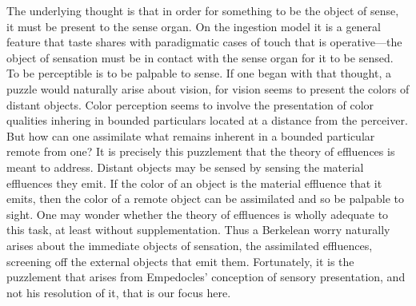 \documentclass[12pt]{article}
\begin{document}
The underlying thought is that in order for something to be the object of sense, it must be present to the sense organ. On the ingestion model it is a general feature that taste shares with paradigmatic cases of touch that is operative---the object of sensation must be in contact with the sense organ for it to be sensed. To be perceptible is to be palpable to sense. If one began with that thought, a puzzle would naturally arise about vision, for vision seems to present the colors of distant objects. Color perception seems to involve the presentation of color qualities inhering in bounded particulars located at a distance from the perceiver. But how can one assimilate what remains inherent in a bounded particular remote from one? It is precisely this puzzlement that the theory of effluences is meant to address. Distant objects may be sensed by sensing the material effluences they emit. If the color of an object is the material effluence that it emits, then the color of a remote object can be assimilated and so be palpable to sight. One may wonder whether the theory of effluences is wholly adequate to this task, at least without supplementation. Thus a Berkelean worry naturally arises about the immediate objects of sensation, the assimilated effluences, screening off the external objects that emit them. Fortunately, it is the puzzlement that arises from Empedocles' conception of sensory presentation, and not his resolution of it, that is our focus here. 
\end{document}
